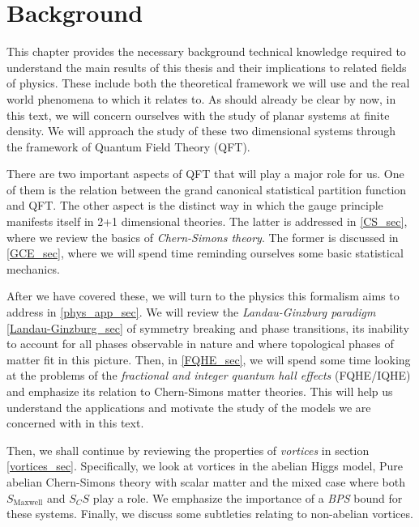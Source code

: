 
    \graphicspath{{Background_Folder/figures/PNG/}{Background_Folder/figures/PDF/}{Background_Folder/figures/}}

\chapter{Background}
        This chapter provides the necessary background technical knowledge required to understand the main results of this thesis and their implications to related fields of physics. These include both the theoretical framework we will use and the real world phenomena to which it relates to. As should already be clear by now, in this text, we will concern ourselves with the study of planar systems at finite density. We will approach the study of these two dimensional systems through the framework of Quantum Field Theory (QFT). 

    There are two important aspects of QFT that will play a major role for us. One of them is the relation between the grand canonical statistical partition function and QFT. The other aspect is the distinct way in which the gauge principle manifests itself in 2+1 dimensional theories. The latter is addressed in \ref{CS_sec}, where we review the basics of \textit{Chern-Simons theory}. The former is discussed in \ref{GCE_sec}, where we will spend time reminding ourselves some basic statistical mechanics. 

    After we have covered these, we will turn to the physics this formalism aims to address in \ref{phys_app_sec}. We will review the \textit{Landau-Ginzburg  paradigm} \ref{Landau-Ginzburg_sec} of symmetry breaking and phase transitions, its inability to account for all phases observable in nature and where topological phases of matter fit in this picture. Then, in \ref{FQHE_sec}, we will spend some time looking at the problems of the \textit{fractional and integer quantum hall effects} (FQHE/IQHE) and emphasize its relation to Chern-Simons matter theories. This will help us understand the applications and motivate the study of the models we are concerned with in this text.

    Then, we shall continue by reviewing the properties of \textit{vortices} in section \ref{vortices_sec}. Specifically, we look at vortices in the abelian Higgs model, Pure abelian Chern-Simons theory with scalar matter and the mixed case where both $S_{\text{Maxwell}}$ and $S_CS$ play a role. We emphasize the importance of a \textit{BPS} bound for these systems. Finally, we discuss some subtleties relating to non-abelian vortices.

